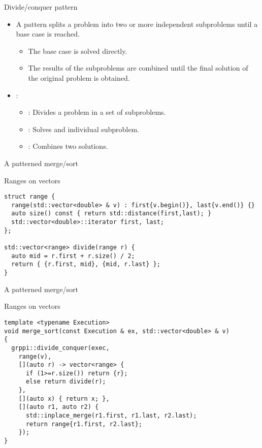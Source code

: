 \begin{frame}[t]{Divide/conquer pattern}
\begin{itemize}
  \item A  pattern splits a problem into two or more independent subproblems until a base case is reached.
    \begin{itemize}
      \item The base case is solved directly.
      \item The results of the subproblems are combined until the final solution of the original problem is obtained.
    \end{itemize}

  \vfill\pause
  \item {}:
    \begin{itemize}
      \item {}: Divides a problem in a set of subproblems.
      \item {}: Solves and individual subproblem.
      \item {}: Combines two solutions.
    \end{itemize}
\end{itemize}
\end{frame}

\begin{frame}[t,fragile]{A patterned merge/sort}
\begin{block}{Ranges on vectors}
\begin{lstlisting}
struct range {
  range(std::vector<double> & v) : first{v.begin()}, last{v.end()} {}
  auto size() const { return std::distance(first,last); }
  std::vector<double>::iterator first, last;
};

std::vector<range> divide(range r) {
  auto mid = r.first + r.size() / 2;
  return { {r.first, mid}, {mid, r.last} };
}
\end{lstlisting}
\end{block}
\end{frame}

\begin{frame}[t,fragile]{A patterned merge/sort}
\begin{block}{Ranges on vectors}
\begin{lstlisting}
template <typename Execution>
void merge_sort(const Execution & ex, std::vector<double> & v)
{
  grppi::divide_conquer(exec,
    range(v),
    [](auto r) -> vector<range> {
      if (1>=r.size()) return {r};
      else return divide(r);
    },
    [](auto x) { return x; },
    [](auto r1, auto r2) {
      std::inplace_merge(r1.first, r1.last, r2.last);
      return range{r1.first, r2.last};
    });
}
\end{lstlisting}
\end{block}
\end{frame}
